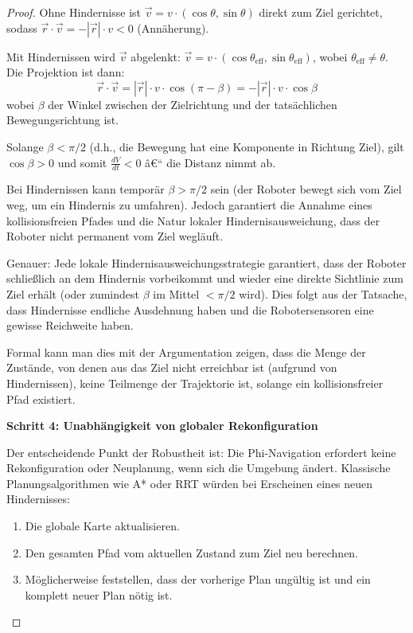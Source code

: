 ﻿\documentclass[a4paper,12pt]{article}
\theoremstyle{definition}
\begin{document}
\begin{proof}
Ohne Hindernisse ist $\vec{v} = v \cdot (\cos\theta, \sin\theta)$ direkt zum Ziel gerichtet, sodass $\vec{r} \cdot \vec{v} = -|\vec{r}| \cdot v < 0$ (Annäherung).

Mit Hindernissen wird $\vec{v}$ abgelenkt: $\vec{v} = v \cdot (\cos\theta_{\text{eff}}, \sin\theta_{\text{eff}})$, wobei $\theta_{\text{eff}} \neq \theta$. Die Projektion ist dann:
\begin{equation}
\vec{r} \cdot \vec{v} = |\vec{r}| \cdot v \cdot \cos(\pi - \beta) = -|\vec{r}| \cdot v \cdot \cos\beta
\end{equation}
wobei $\beta$ der Winkel zwischen der Zielrichtung und der tatsächlichen Bewegungsrichtung ist.

Solange $\beta < \pi/2$ (d.h., die Bewegung hat eine Komponente in Richtung Ziel), gilt $\cos\beta > 0$ und somit $\frac{dV}{dt} < 0$ â€“ die Distanz nimmt ab.

Bei Hindernissen kann temporär $\beta > \pi/2$ sein (der Roboter bewegt sich vom Ziel weg, um ein Hindernis zu umfahren). Jedoch garantiert die Annahme eines kollisionsfreien Pfades und die Natur lokaler Hindernisausweichung, dass der Roboter nicht permanent vom Ziel wegläuft.

Genauer: Jede lokale Hindernisausweichungsstrategie garantiert, dass der Roboter schließlich an dem Hindernis vorbeikommt und wieder eine direkte Sichtlinie zum Ziel erhält (oder zumindest $\beta$ im Mittel $< \pi/2$ wird). Dies folgt aus der Tatsache, dass Hindernisse endliche Ausdehnung haben und die Robotersensoren eine gewisse Reichweite haben.

Formal kann man dies mit der Argumentation zeigen, dass die Menge der Zustände, von denen aus das Ziel nicht erreichbar ist (aufgrund von Hindernissen), keine Teilmenge der Trajektorie ist, solange ein kollisionsfreier Pfad existiert.

\textbf{Schritt 4: Unabhängigkeit von globaler Rekonfiguration}

Der entscheidende Punkt der Robustheit ist: Die Phi-Navigation erfordert keine Rekonfiguration oder Neuplanung, wenn sich die Umgebung ändert. Klassische Planungsalgorithmen wie A* oder RRT würden bei Erscheinen eines neuen Hindernisses:
\begin{enumerate}
\item Die globale Karte aktualisieren.
\item Den gesamten Pfad vom aktuellen Zustand zum Ziel neu berechnen.
\item Möglicherweise feststellen, dass der vorherige Plan ungültig ist und ein komplett neuer Plan nötig ist.
\end{enumerate}


\end{proof}
\end{document}
